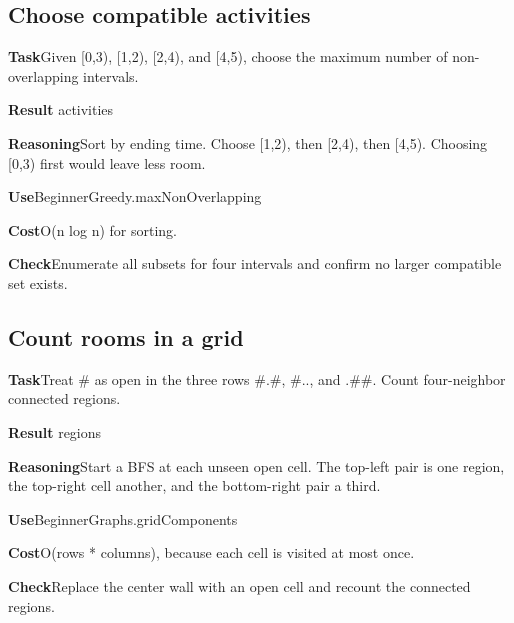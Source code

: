 \documentclass[10pt,letterpaper]{article}
\newcommand{\entrylabel}[1]{\textcolor{accent}{\bfseries #1}}
\begin{document}
\subsection*{Choose compatible activities}
\noindent\entrylabel{Task}\quad Given [0,3), [1,2), [2,4), and [4,5), choose the maximum number of non-overlapping intervals.\par
\noindent\entrylabel{Result} activities\par
\noindent\entrylabel{Reasoning}\quad Sort by ending time. Choose [1,2), then [2,4), then [4,5). Choosing [0,3) first would leave less room.\par
\noindent\entrylabel{Use}\quad BeginnerGreedy.maxNonOverlapping\par
\noindent\entrylabel{Cost}\quad O(n log n) for sorting.\par
\noindent\entrylabel{Check}\quad Enumerate all subsets for four intervals and confirm no larger compatible set exists.\par
\subsection*{Count rooms in a grid}
\noindent\entrylabel{Task}\quad Treat \# as open in the three rows \#.\#, \#.., and .\#\#. Count four-neighbor connected regions.\par
\noindent\entrylabel{Result} regions\par
\noindent\entrylabel{Reasoning}\quad Start a BFS at each unseen open cell. The top-left pair is one region, the top-right cell another, and the bottom-right pair a third.\par
\noindent\entrylabel{Use}\quad BeginnerGraphs.gridComponents\par
\noindent\entrylabel{Cost}\quad O(rows * columns), because each cell is visited at most once.\par
\noindent\entrylabel{Check}\quad Replace the center wall with an open cell and recount the connected regions.\par
\end{document}
